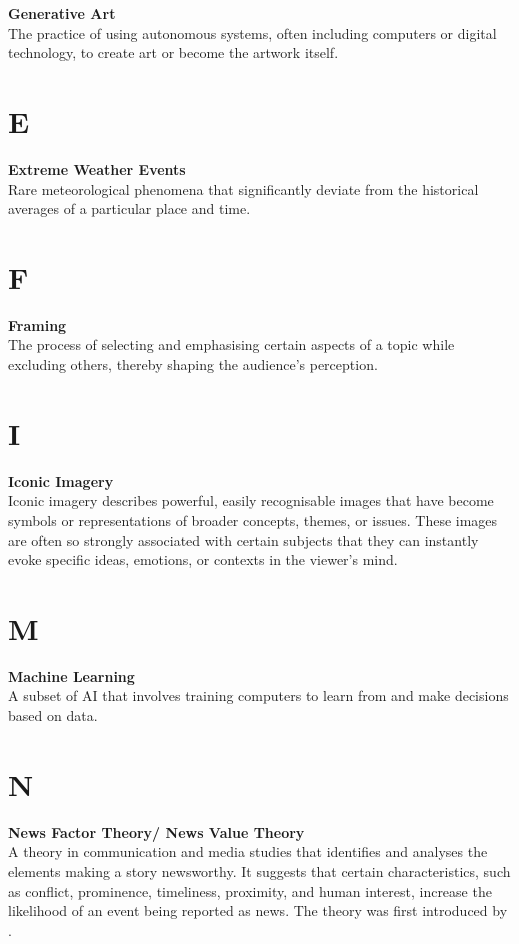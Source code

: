 \noindent \textbf{Generative Art}\\
\noindent The practice of using autonomous systems, often including computers or digital technology, to create art or become the artwork itself.

\section*{E}
\noindent \textbf{Extreme Weather Events}\\
\noindent Rare meteorological phenomena that significantly deviate from the historical averages of a particular place and time.

\section*{F}
\noindent \textbf{Framing}\\
\noindent The process of selecting and emphasising certain aspects of a topic while excluding others, thereby shaping the audience's perception.

\section*{I}
\noindent \textbf{Iconic Imagery}\\
\noindent Iconic imagery describes powerful, easily recognisable images that have become symbols or representations of broader concepts, themes, or issues. These images are often so strongly associated with certain subjects that they can instantly evoke specific ideas, emotions, or contexts in the viewer's mind.


\section*{M}
\noindent \textbf{Machine Learning}\\
\noindent A subset of AI that involves training computers to learn from and make decisions based on data.

\section*{N}
\noindent \textbf{News Factor Theory/ News Value Theory}\\
\noindent A theory in communication and media studies that identifies and analyses the elements making a story newsworthy. It suggests that certain characteristics, such as conflict, prominence, timeliness, proximity, and human interest, increase the likelihood of an event being reported as news. The theory was first introduced by \textcite{Galtung1965}.

